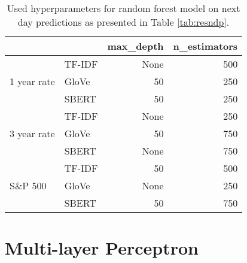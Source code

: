 \begin{table}[H]
    \centering
    \begin{tabular}{llrr}
          & & \textbf{max\_depth} & \textbf{n\_estimators} \\
         \hline \hline
         \multirow{3}{*}{1 year rate} & TF-IDF & None & 500   \\
         & GloVe & 50 & 250    \\
         & SBERT & 50 & 250   \\
         \hline 
         \multirow{3}{*}{3 year rate} & TF-IDF & None & 250   \\
         & GloVe & 50 & 750 \\
         & SBERT & None & 750 \\
         \hline 
         \multirow{3}{*}{S\&P 500} & TF-IDF & 50 & 500 \\
         & GloVe & None & 250 \\
         & SBERT & 50 & 750 \\
         \hline 
    \end{tabular}
    \caption{Used hyperparameters for random forest model on next day predictions as presented in Table \ref{tab:resndp}.}
    \label{tab:rf_hyper_nd}
\end{table}



\section{Multi-layer Perceptron}